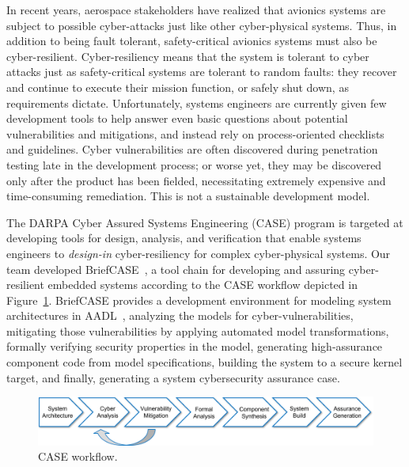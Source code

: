 


In recent years, aerospace stakeholders have realized that avionics systems are subject to possible cyber-attacks just like other cyber-physical systems. Thus, in addition to being fault tolerant, safety-critical avionics systems must also be cyber-resilient. Cyber-resiliency means that the system is tolerant to cyber attacks just as safety-critical systems are tolerant to random faults: they recover and continue to execute their mission function, or safely shut down, as requirements dictate. Unfortunately, systems engineers are currently given few development tools to help answer even basic questions about potential vulnerabilities and mitigations, and instead rely on process-oriented checklists and guidelines. Cyber vulnerabilities are often discovered during penetration testing late in the development process; or worse yet, they may be discovered only after the product has been fielded, necessitating extremely expensive and time-consuming remediation. This is not a sustainable development model. 

The DARPA Cyber Assured Systems Engineering (CASE) program is targeted at developing tools for design, analysis, and verification that enable systems engineers to \textit{design-in} cyber-resiliency for complex cyber-physical systems. 
%
Our team developed BriefCASE~\cite{case-at-scale}, a tool chain for developing and assuring cyber-resilient embedded systems according to the CASE workflow depicted in Figure~\ref{fig:workflow}. BriefCASE provides a development environment for modeling system architectures in AADL~\cite{feiler-aadl}, analyzing the models for cyber-vulnerabilities, mitigating those vulnerabilities by applying automated model transformations, formally verifying security properties in the model, generating high-assurance component code from model specifications, building the system to a secure kernel target, and finally, generating a system cybersecurity assurance case.  

\begin{figure}[h] 
	\centering 
	\includegraphics[width=\textwidth]{figs/workflow.png}
	\caption{CASE workflow.}
	\label{fig:workflow} 
\end{figure}

